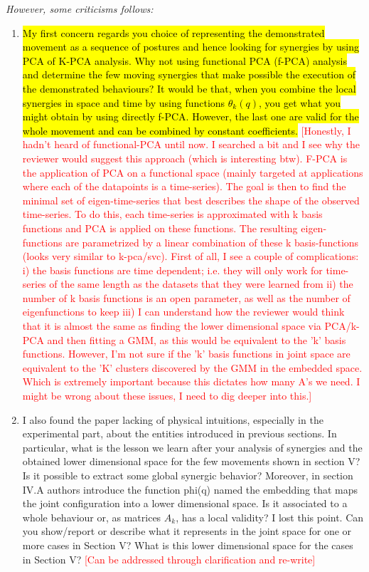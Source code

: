 \documentclass[10pt,stdletter,dateno]{newlfm}
\begin{document}
\begin{newlfm}
\textit{However, some criticisms follows:}
\begin{enumerate}
\item \hl{My first concern regards you choice of representing the demonstrated
movement as a sequence of postures and hence looking for synergies by
using PCA of K-PCA analysis. Why not using functional PCA (f-PCA)
analysis and determine the few moving synergies that make possible the
execution of the demonstrated behaviours? It would be that, when you
combine the local synergies in space and time by using functions
$\theta_k(q)$, you get what you might obtain by using directly f-PCA.
However, the last one are valid for the whole movement and can be
combined by constant coefficients.} \textcolor{red}{[Honestly, I hadn't heard of functional-PCA until now. I searched a bit and I see why the reviewer would suggest this approach (which is interesting btw). F-PCA is the application of PCA on a functional space (mainly targeted at applications where each of the datapoints is a time-series). The goal is then to find the minimal set of eigen-time-series that best describes the shape of the observed time-series.
To do this, each time-series is approximated with k basis functions and PCA is applied on these functions. The resulting eigen-functions are parametrized by a linear combination of these k basis-functions (looks very similar to k-pca/svc). First of all, I see a couple of complications: i) the basis functions are time dependent; i.e. they will only work for time-series of the same length as the datasets that they were learned from ii) the number of k basis functions is an open parameter, as well as the number of eigenfunctions to keep iii) I can understand how the reviewer would think that it is almost the same as finding the lower dimensional space via PCA/k-PCA and then fitting a GMM, as this would be equivalent to the 'k' basis functions. However, I'm not sure if the 'k' basis functions in joint space are equivalent to the 'K' clusters discovered by the GMM in the embedded space. Which is extremely important because this dictates how many A's we need. I might be wrong about these issues, I need to dig deeper into this.]}

\item I also found the paper lacking of physical intuitions, especially in
the experimental part, about the entities introduced in previous
sections. In particular, what is the lesson we learn after your
analysis of synergies and the obtained lower dimensional space for the
few movements shown in section V? Is it possible to extract some global
synergic behavior?
Moreover, in section IV.A authors introduce the function phi(q) named
the embedding that maps the joint configuration into a lower
dimensional space. Is it associated to a whole behaviour or, as
matrices $A_k$, has a local validity? I lost this point. Can you
show/report or describe what it represents in the joint space for one
or more cases in Section V? What is this lower dimensional space for
the cases in Section V? \textcolor{red}{[Can be addressed through clarification and re-write]}


\end{enumerate}
\end{newlfm}
\end{document}
